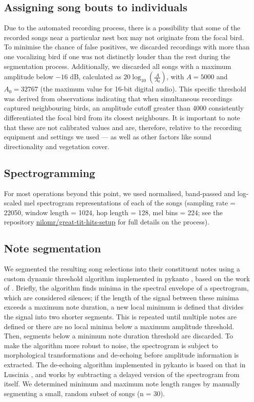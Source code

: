 \subsection{Assigning song bouts to individuals}

Due to the automated recording process, there is a possibility that some of the recorded songs near a particular nest box may not originate from the focal bird. To minimise the chance of false positives, we discarded recordings with more than one vocalizing bird if one was not distinctly louder than the rest during the segmentation process. Additionally, we discarded all songs with a maximum amplitude below $-16$ dB, calculated as $20 \log_{10}\left(\frac{A}{A_0}\right)$, with $A = 5000$ and $A_0 = 32767$ (the maximum value for 16-bit digital audio). This specific threshold was derived from observations indicating that when simultaneous recordings captured neighbouring birds, an amplitude cutoff greater than 4000 consistently differentiated the focal bird from its closest neighbours. It is important to note that these are not calibrated values and are, therefore, relative to the recording equipment and settings we used --- as well as other factors like sound directionality and vegetation cover.

\subsection{Spectrogramming}

For most operations beyond this point, we used normalised, band-passed and log-scaled mel spectrogram representations of each of the songs (sampling rate = 22050,  window length = 1024, hop length = 128, mel bins = 224; see the repository \href{https://github.com/nilomr/great-tit-hits-setup}{nilomr/great-tit-hits-setup} for full details on the process).

\subsection{Note segmentation}

We segmented the resulting song selections into their constituent notes using a custom dynamic threshold algorithm implemented in pykanto \parencite{merinorecalde2023}, based on the work of \textcite{sainburg2019}. Briefly, the algorithm finds minima in the spectral envelope of a spectrogram, which are considered silences; if the length of the signal between these minima exceeds a maximum note duration, a new local minimum is defined that divides the signal into two shorter segments. This is repeated until multiple notes are defined or there are no local minima below a maximum amplitude threshold. Then, segments below a minimum note duration threshold are discarded. To make the algorithm more robust to noise, the spectrogram is subject to morphological transformations and de-echoing before amplitude information is extracted. The de-echoing algorithm implemented in pykanto is based on that in Luscinia \parencite{lachlan2016a}, and works by subtracting a delayed version of the spectrogram from itself. We determined minimum and maximum note length ranges by manually segmenting a small, random subset of songs (n = 30).

